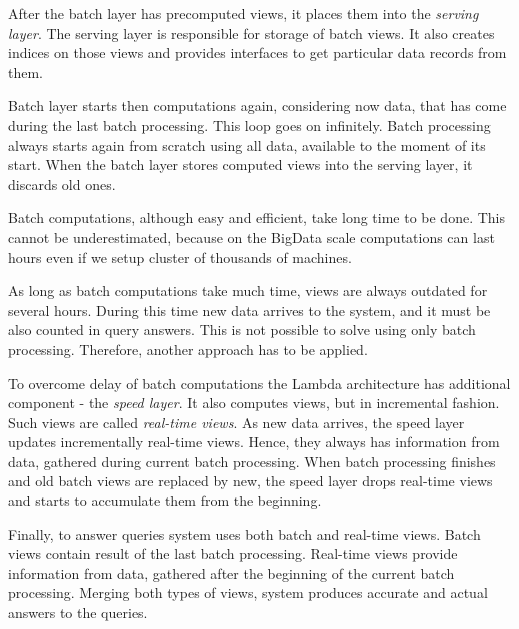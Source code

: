 After the batch layer has precomputed views, it places them into the \textit{serving layer}.
The serving layer is responsible for storage of batch views.
It also creates indices on those views and provides interfaces to get particular data records from them.

Batch layer starts then computations again, considering now data, that has come during the last batch processing.
This loop goes on infinitely.
Batch processing always starts again from scratch using all data, available to the moment of its start.
When the batch layer stores computed views into the serving layer, it discards old ones.

Batch computations, although easy and efficient, take long time to be done.
This cannot be underestimated, because on the BigData scale computations can last hours even if we setup cluster of thousands of machines.

As long as batch computations take much time, views are always outdated for several hours.
During this time new data arrives to the system, and it must be also counted in query answers.
This is not possible to solve using only batch processing.
Therefore, another approach has to be applied.

To overcome delay of batch computations the Lambda architecture has additional component - the \textit{speed layer}.
It also computes views, but in incremental fashion.
Such views are called \textit{real-time views}.
As new data arrives, the speed layer updates incrementally real-time views.
Hence, they always has information from data, gathered during current batch processing.
When batch processing finishes and old batch views are replaced by new, the speed layer drops real-time views and starts to accumulate them from the beginning.

Finally, to answer queries system uses both batch and real-time views.
Batch views contain result of the last batch processing.
Real-time views provide information from data, gathered after the beginning of the current batch processing.
Merging both types of views, system produces accurate and actual answers to the queries.